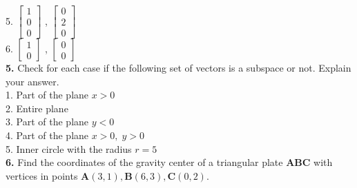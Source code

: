 \documentclass[a4paper,10pt]{article}
\begin{document}
5. $\begin{bmatrix}
  1 \\
  0 \\
  0
 \end{bmatrix}$ ,
  $\begin{bmatrix}
  0 \\
  2 \\
  0
 \end{bmatrix}$ \\
6. $\begin{bmatrix}
  1 \\
  0 
 \end{bmatrix}$ ,
 $\begin{bmatrix}
  0 \\
  0 
 \end{bmatrix}$ \\
 
 \textbf{5.} Check for each case if the following set of vectors is a subspace or not. Explain your answer. \\
 1. Part of the plane $x > 0$ \\
 2. Entire plane \\
 3. Part of the plane $y < 0$ \\
 4. Part of the plane $x > 0, \; y > 0$  \\
 5. Inner circle with the radius $r = 5$ \\
 
\textbf{6.} Find the coordinates of the gravity center of a triangular plate $\mathbf{ABC}$ with vertices in points $\mathbf{A}(3,1), \mathbf{B}(6,3), \mathbf{C}(0,2)$. \\
\end{document}
